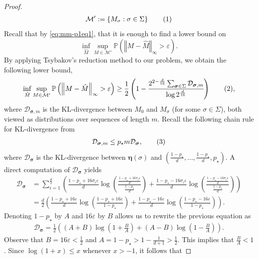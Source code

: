 \documentclass[opre,sglanonrev]{informs4}
\numberwithin{equation}{section}
\newcommand{\lp}{\left(}
\newcommand{\rp}{\right)}
\newcommand{\lc}{\left\{}
\newcommand{\rc}{\right\}}
\newcommand{\Pbb}{\mathbb{P}}
\newcommand{\Mcal}{\mathcal{M}}
\newcommand\numberthis{\addtocounter{equation}{1}\tag{\theequation}}
\newcommand{\prob}{\Pbb}
\newcommand{\nrm}[1]{\left\Vert #1 \right\Vert}
\newcommand{\etab}{\boldsymbol{\eta}}
\newcommand{\eps}{\varepsilon}
\begin{document}
\begin{APPENDICES}
{\begin{proof}
\begin{align*}
    \Mcal':= \lc M_{\sigma}:\sigma\in \Sigma\rc\numberthis\label{eq:mm-p1eq4}
\end{align*}
Recall that by \cref{eq:mm-p1eq1}, that it is enough to find a lower bound on
\[
\inf_{\hat M} \sup_{M\in\Mcal'} \prob\lp{\nrm{M - \hat M}_\infty > \eps}\rp.
\] 
By applying Tsybakov's reduction method \citep[Theorem~2.5]{tsybakov2009introduction} to our problem, we obtain the following lower bound, 
\begin{align*}
    \inf_{\hat M} \sup_{M\in\Mcal'} \prob\lp{\nrm{M - \hat M}_\infty > \eps}\rp \geq \frac{1}{2} \left(1 - \cfrac{2^{2-\frac{d}{16}} \sum_{\boldsymbol{\sigma} \in \Sigma} \mathcal{D}_{\boldsymbol{\sigma},m}}{\log{2^{\frac{d}{16}}}} \right)\numberthis\label{eq:mm-p1eq3},
\end{align*}
where $\mathcal{D}_{\boldsymbol{\sigma},m}$ is the KL-divergence between
$M_0$ and $M_{\sigma}$ (for some $\sigma\in\Sigma$), both viewed as distributions over sequences of length $m$. 
Recall the following chain rule for KL-divergence from \citet[Lemma 6.2]{wolfer2021statistical}
\begin{align*}
   \mathcal{D}_{\boldsymbol{\sigma},m} \leq p_\star m \mathcal{D_{\boldsymbol{\sigma}}},\numberthis\label{eq:mm-p1eq2} 
\end{align*}
where $\mathcal{D_{\boldsymbol{\sigma}}}$ is the KL-divergence between $\etab(\sigma)$ and $\lp\frac{1-p_\star}{d},\dots,\frac{1-p_\star}{d},p_\star\rp$. A direct computation of $\mathcal{D_{\boldsymbol{\sigma}}}$ yields 
\begin{align*}
    \mathcal{D_{\boldsymbol{\sigma}}} & = \sum_{i=1}^{\frac{d}{2}}\lp \frac{1 - p_\star + 16 \sigma_i \eps}{d} \log\lp \frac{\frac{1 - p_\star + 16 \sigma_i \eps}{d}}{\frac{1-p_\star}{d}}\rp+\frac{1 - p_\star - 16 \sigma_i \eps}{d} \log\lp \frac{\frac{1 - p_\star - 16 \sigma_i \eps}{d}}{\frac{1-p_\star}{d}}\rp \rp\\
    & = \frac{d}{2} \lp \frac{1 - p_\star + 16  \eps}{d} \log\lp\frac{1 - p_\star + 16 \eps}{1-p_\star}\rp+\frac{1 - p_\star - 16 \eps}{d} \log\lp \frac{1 - p_\star - 16 \eps}{1-p_\star}\rp \rp.
\end{align*}
Denoting $1-p_\star$ by $A$ and $16\eps$ by $B$ allows us to rewrite the previous equation as
\begin{align*}
\mathcal{D_{\boldsymbol{\sigma}}}=\frac{1}{2} \lp (A+B)\log\lp 1+\frac{B}{A} \rp+ (A-B)\log\lp 1-\frac{B}{A} \rp \rp.
\end{align*}
Observe that $B=16\eps<\frac{1}{2}$ and $A=1-p_\star>1-\frac{1}{d+1}>\frac{1}{2}$. This implies that $\frac{B}{A}<1$. Since $\log\lp 1+x \rp\leq x$ whenever $x>-1$, it follows that

\end{proof}}
\end{APPENDICES}
\end{document}
